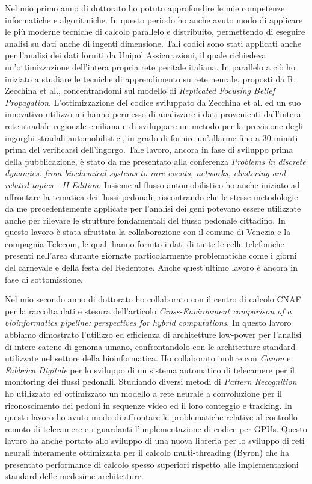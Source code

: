 \documentclass[a4paper,11pt]{article}
\begin{document}
Nel mio primo anno di dottorato ho potuto approfondire le mie competenze informatiche e algoritmiche.
In questo periodo ho anche avuto modo di applicare le più moderne tecniche di calcolo parallelo e distribuito, permettendo di eseguire analisi su dati anche di ingenti dimensione.
Tali codici sono stati applicati anche per l'analisi dei dati forniti da Unipol Assicurazioni, il quale richiedeva un'ottimizzazione dell'intera propria rete peritale italiana.
In parallelo a ciò ho iniziato a studiare le tecniche di apprendimento su rete neurale, proposti da R. Zecchina et al., concentrandomi sul modello di \emph{Replicated Focusing Belief Propagation}.
L'ottimizzazione del codice sviluppato da Zecchina et al. ed un suo innovativo utilizzo mi hanno permesso di analizzare i dati provenienti dall'intera rete stradale regionale emiliana e di sviluppare un metodo per la previsione degli ingorghi stradali automobilistici, in grado di fornire un'allarme fino a 30 minuti prima del verificarsi dell'ingorgo.
Tale lavoro, ancora in fase di sviluppo prima della pubblicazione, %
è stato da me presentato alla conferenza \emph{Problems in discrete dynamics: from biochemical systems to rare events, networks, clustering and related topics - II Edition}.
Insieme al flusso automobilistico ho anche iniziato ad affrontare la tematica dei flussi pedonali, riscontrando che le stesse metodologie da me precedentemente applicate per l'analisi dei geni potevano essere utilizzate anche per rilevare le strutture fondamentali del flusso pedonale cittadino.
In questo lavoro è stata sfruttata la collaborazione con il comune di Venezia e la compagnia Telecom, le quali hanno fornito i dati di tutte le celle telefoniche presenti nell'area durante giornate particolarmente problematiche come i giorni del carnevale e della festa del Redentore.
Anche quest'ultimo lavoro è ancora in fase di sottomissione. %

Nel mio secondo anno di dottorato ho collaborato con il centro di calcolo CNAF per la raccolta dati e stesura dell'articolo \emph{Cross-Environment comparison of a bioinformatics pipeline: perspectives for hybrid computations}.
In questo lavoro abbiamo dimostrato l'utilizzo ed efficienza di architetture low-power per l'analisi di intere catene di genoma umano, confrontandolo con le architetture standard utilizzate nel settore della bioinformatica.
Ho collaborato inoltre con \emph{Canon} e \emph{Fabbrica Digitale} per lo sviluppo di un sistema automatico di telecamere per il monitoring dei flussi pedonali.
Studiando diversi metodi di \emph{Pattern Recognition} ho utilizzato ed ottimizzato un modello a rete neurale a convoluzione per il riconoscimento dei pedoni in sequenze video ed il loro conteggio e tracking.
In questo lavoro ho avuto modo di affrontare le problematiche relative al controllo remoto di telecamere e riguardanti l'implementazione di codice per GPUs.
Questo lavoro ha anche portato allo sviluppo di una nuova libreria per lo sviluppo di reti neurali interamente ottimizzata per il calcolo multi-threading (Byron) che ha presentato performance di calcolo spesso superiori rispetto alle implementazioni standard delle medesime architetture.
\end{document}
